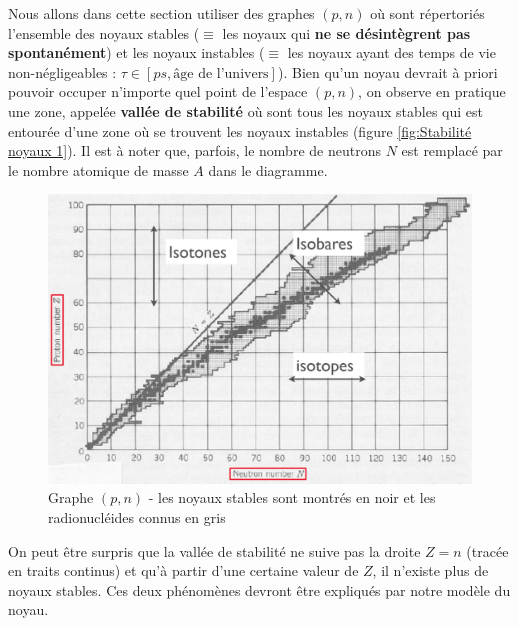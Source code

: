 Nous allons dans cette section utiliser des graphes $(p,n)$ où sont répertoriés l'ensemble des noyaux stables ($\equiv$ les noyaux qui \textbf{ne se désintègrent pas spontanément}) et les noyaux instables ($\equiv$ les noyaux ayant des temps de vie non-négligeables : $\tau \in [ps,\text{âge de l'univers}]$). Bien qu'un noyau devrait à priori pouvoir occuper n'importe quel point de l'espace $(p,n)$, on observe en pratique une zone, appelée \textbf{vallée de stabilité} où sont tous les noyaux stables qui est entourée d'une zone où se trouvent les noyaux instables (figure \ref{fig:Stabilité noyaux 1}). Il est à noter que, parfois, le nombre de neutrons $N$ est remplacé par le nombre atomique de masse $A$ dans le diagramme.
\begin{figure}[H]
    \centering
    \includegraphics[scale=0.3]{Images4/Stabilite_noyaux_1.png}
    \caption{Graphe $(p,n)$ - les noyaux stables sont montrés en noir et les radionucléides connus en gris}
    \label{fig:Stabilité noyaux 2}
\end{figure}
On peut être surpris que la vallée de stabilité ne suive pas la droite $Z=n$ (tracée en traits continus) et qu'à partir d'une certaine valeur de $Z$, il n'existe plus de noyaux stables. Ces deux phénomènes devront être expliqués par notre modèle du noyau.\\

